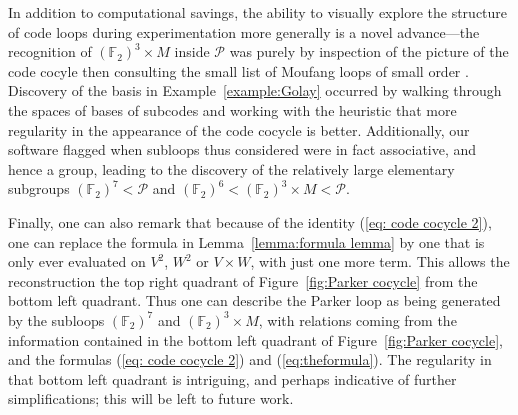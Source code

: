 \documentclass{article}
\theoremstyle{plain}
\theoremstyle{definition}
\def \cP {\mathcal{P}}
\def \FF {\mathbb{F}}
\begin{document}
In addition to computational savings, the ability to visually explore the structure of code loops during experimentation more generally is a novel advance---the recognition of $(\FF_2)^3\times M$ inside $\cP$ was purely by inspection of the picture of the code cocyle then consulting the small list of Moufang loops of small order \cite{Chein}.
Discovery of the basis in Example~\ref{example:Golay} occurred by walking through the spaces of bases of subcodes and working with the heuristic that more regularity in the appearance of the code cocycle is better.
Additionally, our software flagged when subloops thus considered were in fact associative, and hence a group, leading to the discovery of the relatively large elementary subgroups $(\FF_2)^7 < \cP$ and $(\FF_2)^6 < (\FF_2)^3\times M < \cP$. 

Finally, one can also remark that because of the identity (\ref{eq: code cocycle 2}), one can replace the formula in Lemma~\ref{lemma:formula lemma} by one that is only ever evaluated on $V^2$, $W^2$ or $V\times W$, with just one more term. This allows the reconstruction the top right quadrant of Figure~\ref{fig:Parker cocycle} from the bottom left quadrant. 
Thus one can describe the Parker loop as being generated by the subloops $(\FF_2)^7$ and $(\FF_2)^3\times M$, with relations coming from the information contained in the bottom left quadrant of Figure~\ref{fig:Parker cocycle}, and the formulas (\ref{eq: code cocycle 2}) and (\ref{eq:theformula}).
The regularity in that bottom left quadrant is intriguing, and perhaps indicative of further simplifications; this will be left to future work.

\newpage
\end{document}
